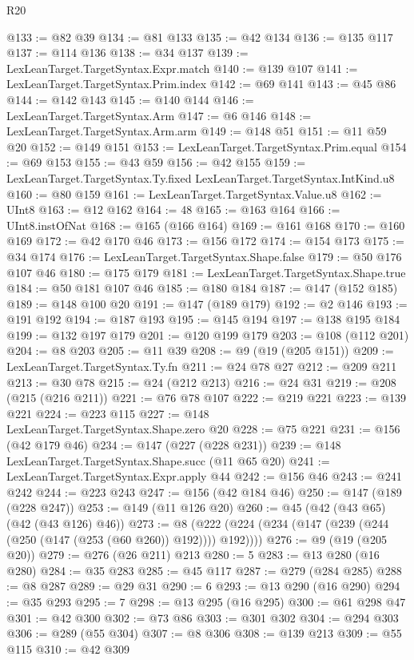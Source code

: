 \begin{lexlean}{R20}
\begin{coremodule}
{{{{{{{{{{{{{{{{{{{@133 := @82 @39
@134 := @81 @133
@135 := @42 @134
@136 := @135 @117
@137 := @114 @136
@138 := @34 @137
@139 := LexLeanTarget.TargetSyntax.Expr.match
@140 := @139 @107
@141 := LexLeanTarget.TargetSyntax.Prim.index
@142 := @69 @141
@143 := @45 @86
@144 := @142 @143
@145 := @140 @144
@146 := LexLeanTarget.TargetSyntax.Arm
@147 := @6 @146
@148 := LexLeanTarget.TargetSyntax.Arm.arm
@149 := @148 @51
@151 := @11 @59 @20
@152 := @149 @151
@153 := LexLeanTarget.TargetSyntax.Prim.equal
@154 := @69 @153
@155 := @43 @59
@156 := @42 @155
@159 := LexLeanTarget.TargetSyntax.Ty.fixed LexLeanTarget.TargetSyntax.IntKind.u8
@160 := @80 @159
@161 := LexLeanTarget.TargetSyntax.Value.u8
@162 := UInt8
@163 := @12 @162
@164 := 48
@165 := @163 @164
@166 := UInt8.instOfNat
@168 := @165 (@166 @164)
@169 := @161 @168
@170 := @160 @169
@172 := @42 @170 @46
@173 := @156 @172
@174 := @154 @173
@175 := @34 @174
@176 := LexLeanTarget.TargetSyntax.Shape.false
@179 := @50 @176 @107 @46
@180 := @175 @179
@181 := LexLeanTarget.TargetSyntax.Shape.true
@184 := @50 @181 @107 @46
@185 := @180 @184
@187 := @147 (@152 @185)
@189 := @148 @100 @20
@191 := @147 (@189 @179)
@192 := @2 @146
@193 := @191 @192
@194 := @187 @193
@195 := @145 @194
@197 := @138 @195 @184
@199 := @132 @197 @179
@201 := @120 @199 @179
@203 := @108 (@112 @201)
@204 := @8 @203
@205 := @11 @39
@208 := @9 (@19 (@205 @151))
@209 := LexLeanTarget.TargetSyntax.Ty.fn
@211 := @24 @78 @27
@212 := @209 @211
@213 := @30 @78
@215 := @24 (@212 @213)
@216 := @24 @31
@219 := @208 (@215 (@216 @211))
@221 := @76 @78 @107
@222 := @219 @221
@223 := @139 @221
@224 := @223 @115
@227 := @148 LexLeanTarget.TargetSyntax.Shape.zero @20
@228 := @75 @221
@231 := @156 (@42 @179 @46)
@234 := @147 (@227 (@228 @231))
@239 := @148 LexLeanTarget.TargetSyntax.Shape.succ (@11 @65 @20)
@241 := LexLeanTarget.TargetSyntax.Expr.apply @44
@242 := @156 @46
@243 := @241 @242
@244 := @223 @243
@247 := @156 (@42 @184 @46)
@250 := @147 (@189 (@228 @247))
@253 := @149 (@11 @126 @20)
@260 := @45 (@42 (@43 @65) (@42 (@43 @126) @46))
@273 := @8 (@222 (@224 (@234 (@147 (@239 (@244 (@250 (@147 (@253 (@60 @260)) @192)))) @192))))
@276 := @9 (@19 (@205 @20))
@279 := @276 (@26 @211) @213
@280 := 5
@283 := @13 @280 (@16 @280)
@284 := @35 @283
@285 := @45 @117
@287 := @279 (@284 @285)
@288 := @8 @287
@289 := @29 @31
@290 := 6
@293 := @13 @290 (@16 @290)
@294 := @35 @293
@295 := 7
@298 := @13 @295 (@16 @295)
@300 := @61 @298 @47
@301 := @42 @300
@302 := @73 @86
@303 := @301 @302
@304 := @294 @303
@306 := @289 (@55 @304)
@307 := @8 @306
@308 := @139 @213
@309 := @55 @115
@310 := @42 @309
}}}}}}}}}}}}}}}}}}}
\end{coremodule}
\end{lexlean}
